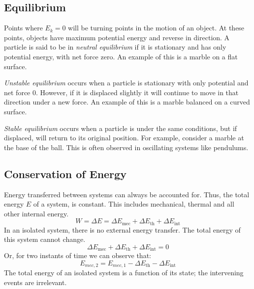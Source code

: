 \documentclass[12pt]{report}
\begin{document}
\begin{flushleft}
\subsection*{Equilibrium}
Points where \(E_k = 0\) will be turning points in the motion of an object. At these
points, objects have maximum potential energy and reverse in direction. A particle is
said to be in \textit{neutral equilibrium} if it is stationary and has only potential energy,
with net force zero. An example of this is a marble on a flat surface.

\bigskip
\textit{Unstable equilibrium} occurs when a particle is stationary with only 
potential and net force \(0\). However, if it is displaced slightly it will continue 
to move in that direction under a new force. An example of this is a marble balanced on
a curved surface.

\bigskip
\textit{Stable equilibrium} occurs when a particle is under the same conditions, but if 
displaced, will return to its original position. For example, consider a marble at the base
of the ball. This is often observed in oscillating systems like pendulums.

\subsection*{Conservation of Energy}
Energy transferred between systems can always be accounted for. Thus, the total energy \(E\)
of a system, is constant. This includes mechanical, thermal and all other internal energy.
\[W = \Delta E = \Delta E_\mathrm{mec} + \Delta E_\mathrm{th} + \Delta E_\mathrm{int}\]
In an isolated system, there is no external energy transfer. The total energy of this system
cannot change.
\[\Delta E_\mathrm{mec} + \Delta E_\mathrm{th} + \Delta E_\mathrm{int} = 0\]
Or, for two instants of time we can observe that:
\[E_{mec,2} = E_{mec,1} - \Delta E_\mathrm{th} - \Delta E_\mathrm{int}\]
The total energy of an isolated system is a function of its state; the intervening
events are irrelevant.

\end{flushleft}
\end{document}
